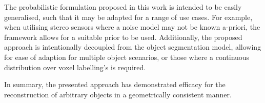 The probabilistic formulation proposed in this work is intended to be easily generalised, such that 
it may be adapted for a range of use cases. For example, when utilising stereo sensors where a noise 
model may not be known a-priori, the framework allows for a suitable prior to be used. Additionally, 
the proposed approach is intentionally decoupled from the object segmentation model, allowing for 
ease of adaption for multiple object scenarios, or those where a continuous distribution over voxel 
labelling's is required.

In summary, the presented approach has demonstrated efficacy for the reconstruction of arbitrary 
objects in a geometrically consistent manner.
